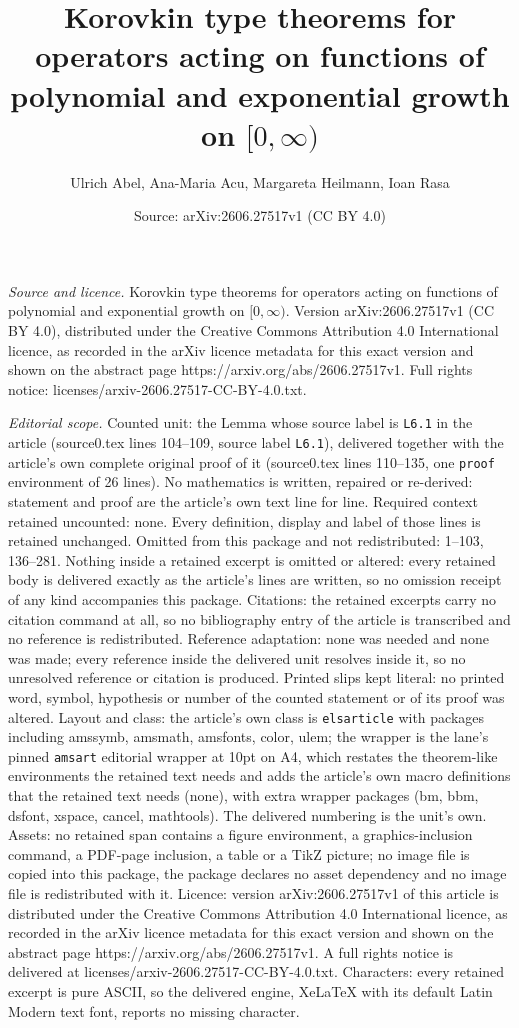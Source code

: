 \documentclass[10pt,a4paper]{amsart}
\title[Korovkin type theorems for operators acting on functions of ]{Korovkin type theorems for operators acting on functions of polynomial and exponential growth on $[0,\infty)$}
\author{Ulrich Abel, Ana-Maria Acu, Margareta Heilmann, Ioan Rasa}
\date{Source: arXiv:2606.27517v1 (CC BY 4.0)}
\begin{document}
\maketitle

\noindent\emph{Source and licence.} Korovkin type theorems for operators acting on functions of polynomial and exponential growth on $[0,\infty)$. Version arXiv:2606.27517v1 (CC BY 4.0), distributed under the Creative Commons Attribution 4.0 International licence, as recorded in the arXiv licence metadata for this exact version and shown on the abstract page https://arxiv.org/abs/2606.27517v1. Full rights notice: licenses/arxiv-2606.27517-CC-BY-4.0.txt.\par\smallskip

\noindent\textit{Editorial scope.} Counted unit: the Lemma whose source label is \texttt{L6.1} in the article (source0.tex lines 104--109, source label \texttt{L6.1}), delivered together with the article's own complete original proof of it (source0.tex lines 110--135, one \texttt{proof} environment of 26 lines). No mathematics is written, repaired or re-derived: statement and proof are the article's own text line for line. Required context retained uncounted: none. Every definition, display and label of those lines is retained unchanged. Omitted from this package and not redistributed: 1--103, 136--281. Nothing inside a retained excerpt is omitted or altered: every retained body is delivered exactly as the article's lines are written, so no omission receipt of any kind accompanies this package. Citations: the retained excerpts carry no citation command at all, so no bibliography entry of the article is transcribed and no reference is redistributed. Reference adaptation: none was needed and none was made; every reference inside the delivered unit resolves inside it, so no unresolved reference or citation is produced. Printed slips kept literal: no printed word, symbol, hypothesis or number of the counted statement or of its proof was altered. Layout and class: the article's own class is \texttt{elsarticle} with packages including amssymb, amsmath, amsfonts, color, ulem; the wrapper is the lane's pinned \texttt{amsart} editorial wrapper at 10pt on A4, which restates the theorem-like environments the retained text needs and adds the article's own macro definitions that the retained text needs (none), with extra wrapper packages (bm, bbm, dsfont, xspace, cancel, mathtools). The delivered numbering is the unit's own. Assets: no retained span contains a figure environment, a graphics-inclusion command, a PDF-page inclusion, a table or a TikZ picture; no image file is copied into this package, the package declares no asset dependency and no image file is redistributed with it. Licence: version arXiv:2606.27517v1 of this article is distributed under the Creative Commons Attribution 4.0 International licence, as recorded in the arXiv licence metadata for this exact version and shown on the abstract page https://arxiv.org/abs/2606.27517v1. A full rights notice is delivered at licenses/arxiv-2606.27517-CC-BY-4.0.txt. Characters: every retained excerpt is pure ASCII, so the delivered engine, XeLaTeX with its default Latin Modern text font, reports no missing character.
\end{document}
